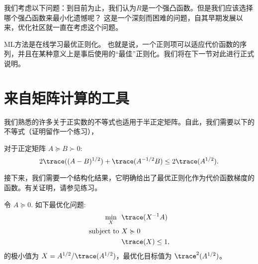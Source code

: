 我们考虑以下问题：到目前为止，我们认为$R$是一个强凸函数。但是我们应该选择哪个强凸函数来最小化遗憾呢？
这是一个深刻而困难的问题，自其早期发展以来，优化社区就一直在考虑这个问题。

ML方法是在线学习最优正则化。
也就是说，一个正则项可以适应代价函数的序列，并且在某种意义上是事后使用的“最佳”正则化。我们将在下一节对此进行正式说明。

\section{
    来自矩阵计算的工具
    }

我们熟悉的许多关于正实数的不等式也适用于半正定矩阵。自此，我们需要以下的不等式（证明留作一个练习），
\begin{proposition} \label{proposition:psd-shalom}
对于正定矩阵
$ A \succcurlyeq B \succ 0$:
$$ 2 \trace( ({A - B})^{1/2}  )  + \trace( A^{-1/2}B)  \leq 2 \trace( {A}^{1/2} ).  $$
\end{proposition}


接下来，我们需要一个结构化结果，它明确给出了最优正则化作为代价函数梯度的函数。有关证明，请参见练习。
\begin{proposition}
\label{proposition:solution-inv-trace}
令 $A \succcurlyeq 0$. 如下最优化问题:
\begin{align*}
\min_X \ \  &  \trace(X^{-1}A)  \\
\mbox{subject to  }   & X \succcurlyeq 0 \\
&  \trace(X) \le 1 ,
\end{align*}
的极小值为 $X = {A^{1/2}}/{ \trace(A^{1/2})}$，最优化目标值为 $\trace^2(A^{1/2})$。
\end{proposition}


